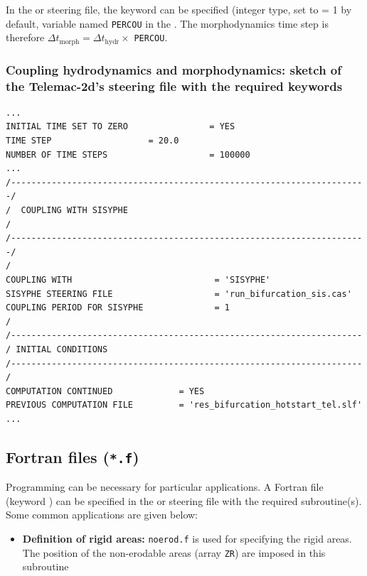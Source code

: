 {In the  or  steering file, the keyword  can be specified (integer type, set to {\ttfamily = 1} by default, variable named \texttt{PERCOU} in the \telemacsystem{}. The morphodynamics time step is therefore $\Delta t_{\text{morph}} = \Delta t_{\text{hydr}} \times$ \texttt{PERCOU}.

\pagebreak

\subsubsection{Coupling hydrodynamics and morphodynamics: sketch of the Telemac-2d's steering file with the required keywords}
\lstset{language=TelemacCas,
        basicstyle=\scriptsize\ttfamily}
\begin{lstlisting}[frame=trBL]
...
INITIAL TIME SET TO ZERO                = YES
TIME STEP			        = 20.0
NUMBER OF TIME STEPS                    = 100000
...
/----------------------------------------------------------------------/
/  COUPLING WITH SISYPHE                                               /
/----------------------------------------------------------------------/
/
COUPLING WITH                            = 'SISYPHE'
SISYPHE STEERING FILE                    = 'run_bifurcation_sis.cas'
COUPLING PERIOD FOR SISYPHE              = 1
/
/---------------------------------------------------------------------
/ INITIAL CONDITIONS
/---------------------------------------------------------------------
/
COMPUTATION CONTINUED             = YES
PREVIOUS COMPUTATION FILE         = 'res_bifurcation_hotstart_tel.slf'
...
\end{lstlisting}
\subsection{Fortran files (\texttt{*.f})}
Programming can be necessary for particular applications. A Fortran file (keyword ) can be specified in the  or  steering file with the required subroutine(s). Some common applications are given below:
\begin{itemize}
\item \textbf{Definition of rigid areas:} \texttt{noerod.f} is used for specifying the rigid areas. The position of the non-erodable areas (array \texttt{ZR}) are imposed in this subroutine 


\end{itemize}}
